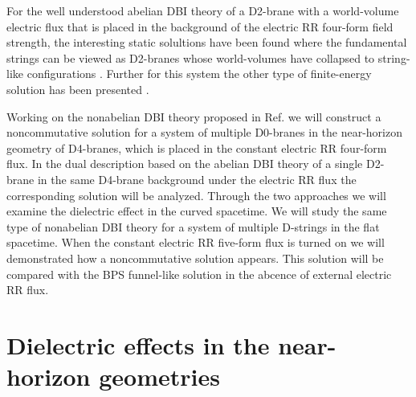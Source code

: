 \documentclass[12pt,a4paper]{article}
\begin{document}
For the well understood abelian DBI theory of a D2-brane 
with a world-volume electric flux that is placed 
in the background of the electric RR four-form field
strength, the interesting static solultions have been found where
the fundamental strings can be viewed as D2-branes whose world-volumes
have collapsed to string-like configurations \cite{RE}.
Further for this system the other type of finite-energy solution has
been presented \cite{PTM}.

Working on the nonabelian DBI theory proposed in Ref. \cite{RCM}
we will construct a noncommutative solution for a system of multiple
D0-branes in the near-horizon geometry of D4-branes,
which is placed in the constant electric RR four-form flux.
In the dual description based on the abelian DBI theory of a 
single D2-brane in the same D4-brane background under the electric
RR flux the corresponding solution will be analyzed. Through the two 
approaches we will examine the dielectric effect in the curved spacetime.
We will study the same type of nonabelian 
DBI theory for a system of multiple D-strings in the flat 
spacetime. When the constant electric RR five-form
flux is turned on we will demonstrated how a noncommutative solution
appears. This solution will be compared with the BPS funnel-like 
solution in the abcence of external electric RR flux. 

\section{Dielectric effects in the near-horizon geometries}
\end{document}

